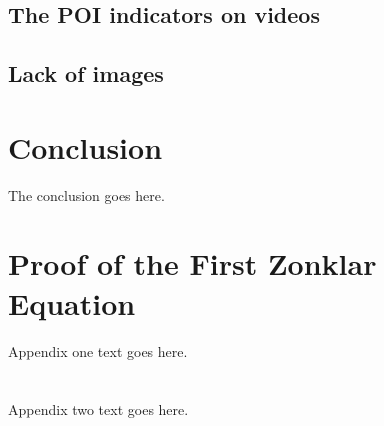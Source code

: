 \documentclass[journal]{IEEEtran}
\begin{document}
\subsection{The POI indicators on videos}
\subsection{Lack of images}


\section{Conclusion}
The conclusion goes here.






%


\appendices
\section{Proof of the First Zonklar Equation}
Appendix one text goes here.

\section{}
Appendix two text goes here.
\end{document}

